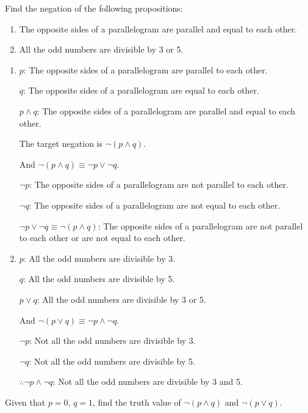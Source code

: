 \documentclass{report}
\newcounter{example}
\begin{document}
\vspace{0.5cm}
\begin{example}
    \item Find the negation of the following propositions:
    \begin{enumerate}[label=(\alph*)]
        \item The opposite sides of a parallelogram are parallel and equal to each other.
        \item All the odd numbers are divisible by 3 or 5.
    \end{enumerate}
\end{example}
\begin{solution}
    \item \begin{enumerate}[label=(\alph*)]
        \item $p$: The opposite sides of a parallelogram are parallel to each other.

              $q$: The opposite sides of a parallelogram are equal to each other.

              $p \land q$: The opposite sides of a parallelogram are parallel and equal to each other.

              The target negation is $\neg(p \land q)$.

              And $\neg(p \land q) \equiv \neg p \lor \neg q$.

              $\neg p$: The opposite sides of a parallelogram are not parallel to each other.

              $\neg q$: The opposite sides of a parallelogram are not equal to each other.

              $\neg p \lor \neg q \equiv \neg(p \land q)$: The opposite sides of a parallelogram are not parallel to each other or are not equal to each other.

        \item $p$: All the odd numbers are divisible by 3.

              $q$: All the odd numbers are divisible by 5.

              $p \lor q$: All the odd numbers are divisible by 3 or 5.

              And $\neg(p \lor q) \equiv \neg p \land \neg q$.

              $\neg p$: Not all the odd numbers are divisible by 3.

              $\neg q$: Not all the odd numbers are divisible by 5.

              $\therefore \neg p \land \neg q$: Not all the odd numbers are divisible by 3 and 5.
    \end{enumerate}
\end{solution}
\vspace{0.1cm}
\begin{example}
    \item Given that $p = 0$, $q = 1$, find the truth value of $\neg (p \land q)$ and
    $\neg (p \lor q)$.
\end{example}
\end{document}
